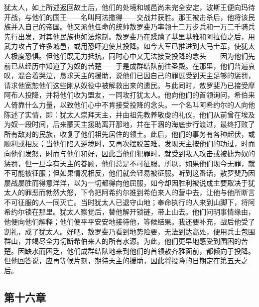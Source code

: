 犹太人，如上所述返回故土后，他们的处境和城邑尚未完全安定，波斯王便向玛待开战，与他们的国王——名叫阿法撒得——交战并获胜。那王被击杀后，他将该民族并入自己的帝国。他又派他任命的统帅敖罗斐乃率领十二万步兵和一万二千骑兵先行出发，对其他民族也如法炮制。敖罗斐乃在蹂躏了基里基雅和阿拉伯之后，用武力攻占了许多城邑，或用恐吓迫使其投降。如今大军已推进到大马士革，使犹太人极度恐惧。但他们既无力抵抗，同时心中又无法接受投降的念头——因为他们先前已从经历中知道了为奴的苦楚——于是成群结队前往圣殿。在那里，他们普遍哀叹，混合着哭泣，恳求天主的援助，说他们已因自己的罪愆受到天主足够的惩罚，请求他宽恕他们这些刚从奴役中被解救出来的遗民。与此同时，敖罗斐乃已接受摩阿布人投降，并将他们收为盟友，一同攻打犹太人。他向他们的首领询问，希伯来人倚靠什么力量，以致他们心中不肯接受投降的念头。一个名叫阿希约尔的人向他陈述了实情，即：犹太人崇拜天主，并由祖先教养敬虔的礼仪，他们从前曾在埃及为奴一段时间，后来蒙天主援助离开那地，并在干涸的海底步行渡过，最终打败了所有敌对的民族，收复了他们祖先居住的领土。此后，他们的事务有各种起伏，或顺利或相反；当他们陷入逆境时，又再次摆脱苦难，发现天主按他们的功过，时而向他们发怒，时而与他们和好，因此当他们犯罪时，就受到敌人攻击或被掳为奴的惩罚，但一旦享有天主的眷顾，他们总是不可征服。所以，如果他们现今无罪，就不可能被征服；但如果情况相反，他们就会轻易被征服。听到这番话，敖罗斐乃因屡战屡胜而得意洋洋，以为一切都得向他屈服，如今却因胜利被说成主要取决于犹太人的罪恶而勃然大怒，下令把阿希约尔推到希伯来人的营中去，让他与他所断言不可征服的人一同灭亡。当时犹太人已退守山地；奉命执行的人来到山脚下，将阿希约尔锁在那里。犹太人察觉后，替他解开锁链，带上山去。他们问明事情缘由，他便向他们解释；他们便平平安安地接待他，等候结果。我还要补充，战后他受了割礼，成了犹太人。好吧，敖罗斐乃看到地势险要，无法到达高处，便用兵士包围群山，并竭尽全力切断希伯来人的所有水源。为此，他们更早地感受到围困的苦楚。因缺水而困乏，他们成群结队地来到他们的首领敖齐雅面前，都倾向于投降。但他回答说，应再等候片刻，期待天主的援助，因此将投降的日期定在第五天之后。\par


\subsection{第十六章}

